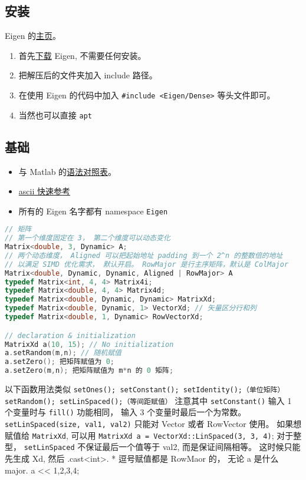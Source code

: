 
\subsection{安装}
Eigen 的\href{http://eigen.tuxfamily.org/index.php?title=Main_Page}{主页}。
\begin{enumerate}
\item 首先\href{http://eigen.tuxfamily.org/index.php?title=Main_Page#Documentation}{下载} Eigen, 不需要任何安装。
\item 把解压后的文件夹加入 include 路径。
\item 在使用 Eigen 的代码中加入 \verb|#include <Eigen/Dense>| 等头文件即可。
\item 当然也可以直接 \verb`apt  `
\end{enumerate}

\subsection{基础}
\begin{itemize}
\item 与 Matlab 的\href{https://eigen.tuxfamily.org/dox/AsciiQuickReference.txt}{语法对照表}。
\item \href{https://eigen.tuxfamily.org/dox/AsciiQuickReference.txt}{ascii 快速参考}
\item 所有的 Eigen 名字都有 namespace \verb|Eigen|
\end{itemize}

\begin{lstlisting}[language=cpp]
// 矩阵
// 第一个维度固定在 3， 第二个维度可以动态变化
Matrix<double, 3, Dynamic> A;
// 两个动态维度， Aligned 可以把起始地址 padding 到一个 2^n 的整数倍的地址
// 以满足 SIMD 优化需求， 默认开启。 RowMajor 是行主序矩阵，默认是 ColMajor
Matrix<double, Dynamic, Dynamic, Aligned | RowMajor> A 
typedef Matrix<int, 4, 4> Matrix4i;
typedef Matrix<double, 4, 4> Matrix4d;
typedef Matrix<double, Dynamic, Dynamic> MatrixXd;
typedef Matrix<double, Dynamic, 1> VectorXd; // 矢量区分行和列
typedef Matrix<double, 1, Dynamic> RowVectorXd;

// declaration & initialization
MatrixXd a(10, 15); // No initialization
a.setRandom(m,n); // 随机赋值
a.setZero(); 把矩阵赋值为 0;
a.setZero(m,n); 把矩阵赋值为 m*n 的 0 矩阵;
\end{lstlisting}

以下函数用法类似
\verb|setOnes(); setConstant(); setIdentity();（单位矩阵） setRandom(); setLinSpaced();（等间距赋值）|
注意其中 \verb|setConstant()| 输入 1 个变量时与 \verb|fill()| 功能相同， 输入 3 个变量时最后一个为常数。 \verb|setLinSpaced(size, val1, val2)| 只能对 Vector 或者 RowVector 使用。 如果想赋值给 \verb|MatrixXd|, 可以用 \verb|MatrixXd a = VectorXd::LinSpaced(3, 3, 4)|; 对于整型， \verb|setLinSpaced| 不保证最后一个值等于 val2, 而是保证间隔相等。 这时候只能先生成 Xd, 然后 .cast<int>.
* 逗号赋值都是 RowMaor 的， 无论 a 是什么 major.
a << 1,2,3,4;


